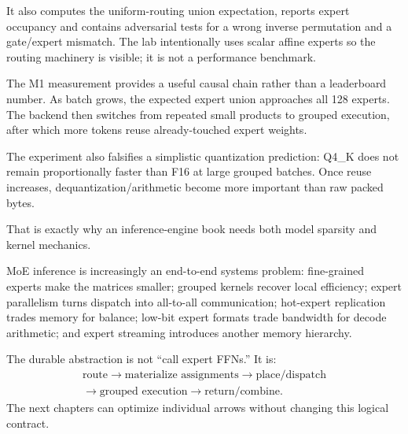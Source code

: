 It also computes the uniform-routing union expectation, reports expert occupancy and
contains adversarial tests for a wrong inverse permutation and a gate/expert mismatch.
The lab intentionally uses scalar affine experts so the routing machinery is visible;
it is not a performance benchmark.


The M1 measurement provides a useful causal chain rather than a leaderboard number.
As batch grows, the expected expert union approaches all 128 experts. The backend then
switches from repeated small products to grouped execution, after which more tokens
reuse already-touched expert weights.

The experiment also falsifies a simplistic quantization prediction: Q4\_K does not
remain proportionally faster than F16 at large grouped batches. Once reuse increases,
dequantization/arithmetic become more important than raw packed bytes.

That is exactly why an inference-engine book needs both model sparsity and kernel
mechanics.


MoE inference is increasingly an end-to-end systems problem: fine-grained experts make
the matrices smaller; grouped kernels recover local efficiency; expert parallelism
turns dispatch into all-to-all communication; hot-expert replication trades memory for
balance; low-bit expert formats trade bandwidth for decode arithmetic; and expert
streaming introduces another memory hierarchy.

The durable abstraction is not ``call expert FFNs.'' It is:
\[
\boxed{\begin{gathered}
\text{route}\rightarrow\text{materialize assignments}\rightarrow\text{place/dispatch}\\
\rightarrow\text{grouped execution}\rightarrow\text{return/combine}.
\end{gathered}}
\]
The next chapters can optimize individual arrows without changing this logical
contract.

